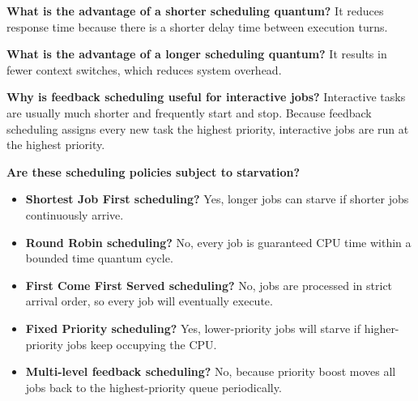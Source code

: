 \documentclass[11pt,a4paper]{article}
\begin{document}
\vspace{0.3em}
\noindent \textbf{What is the advantage of a shorter scheduling quantum?} 
It reduces response time because there is a shorter delay time between execution turns.

\hspace{5pt}

\vspace{0.3em}
\noindent \textbf{What is the advantage of a longer scheduling quantum?} 
It results in fewer context switches, which reduces system overhead.

\hspace{5pt}

\vspace{0.3em}
\noindent \textbf{Why is feedback scheduling useful for interactive jobs?} 
Interactive tasks are usually much shorter and frequently start and stop. Because feedback scheduling assigns every new task the highest priority, interactive jobs are run at the highest priority.

\hspace{5pt}

\vspace{0.3em}
\noindent \textbf{Are these scheduling policies subject to starvation?} 

\begin{itemize}
    \item \textbf{Shortest Job First scheduling?} Yes, longer jobs can starve if shorter jobs continuously arrive.
    \item \textbf{Round Robin scheduling?} No, every job is guaranteed CPU time within a bounded time quantum cycle.
    \item \textbf{First Come First Served scheduling?} No, jobs are processed in strict arrival order, so every job will eventually execute.
    \item \textbf{Fixed Priority scheduling?} Yes, lower-priority jobs will starve if higher-priority jobs keep occupying the CPU.
    \item \textbf{Multi-level feedback scheduling?} No, because priority boost moves all jobs back to the highest-priority queue periodically.
\end{itemize}
\end{document}
